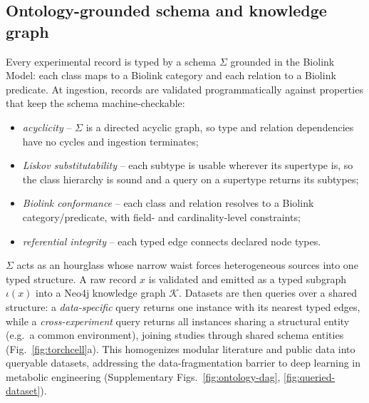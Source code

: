 \subsection*{Ontology-grounded schema and knowledge graph}
Every experimental record is typed by a schema $\Sigma$ grounded in the Biolink Model:
each class maps to a Biolink category and each relation to a Biolink predicate. At
ingestion, records are validated programmatically against properties that keep the schema
machine-checkable:
\begin{itemize}
\item \emph{acyclicity} -- $\Sigma$ is a directed acyclic graph, so type and relation
dependencies have no cycles and ingestion terminates;
\item \emph{Liskov substitutability} -- each subtype is usable wherever its supertype is,
so the class hierarchy is sound and a query on a supertype returns its subtypes;
\item \emph{Biolink conformance} -- each class and relation resolves to a Biolink
category/predicate, with field- and cardinality-level constraints;
\item \emph{referential integrity} -- each typed edge connects declared node types.
\end{itemize}
$\Sigma$ acts as an hourglass whose narrow waist forces heterogeneous sources into one
typed structure. A raw record $x$ is validated and emitted as a typed subgraph $\iota(x)$
into a Neo4j knowledge graph $\mathcal{K}$. Datasets are then queries over a shared
structure: a \emph{data-specific} query returns one instance with its nearest typed
edges, while a \emph{cross-experiment} query returns all instances sharing a structural
entity (e.g.\ a common environment), joining studies through shared schema entities
(Fig.~\ref{fig:torchcell}a). This homogenizes modular literature and public data into
queryable datasets, addressing the data-fragmentation barrier to deep learning in
metabolic engineering (Supplementary Figs.~\ref{fig:ontology-dag}, \ref{fig:queried-dataset}).

